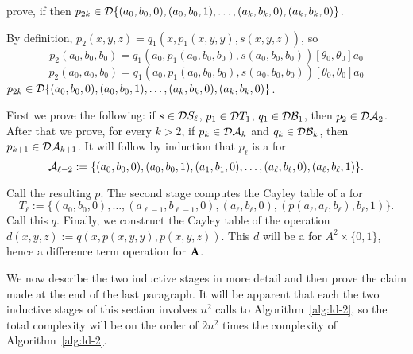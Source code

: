   prove, if
  then
  $p_{2k} \in \mathcal{D} \{(a_0, b_0, 0), (a_0, b_0, 1), \dots, (a_k, b_k, 0), (a_k, b_k, 0)\}$.

  By definition,
  $p_2(x,y,z) = q_1(x, p_1(x,y,y), s(x,y,z))$, so
  \[
  p_2(a_0, b_0, b_0) = q_1(a_0, p_1(a_0,b_0,b_0), s(a_0,b_0,b_0))\mathrel{[\theta_0, \theta_0]}a_0
  \]
  \[
  p_2(a_0, a_0, b_0) = q_1(a_0, p_1(a_0,b_0,b_0), s(a_0,b_0,b_0))\mathrel{[\theta_0, \theta_0]}a_0
  \]
  $p_{2k} \in \mathcal{D} \{(a_0, b_0, 0), (a_0, b_0, 1), \dots, (a_k, b_k, 0), (a_k, b_k, 0)\}$.

  First we prove the following: if $s \in \mathcal{D} S_\ell$,  $p_1 \in \mathcal{D} T_1$, $q_1\in \mathcal{D} \mathcal{B}_1$,
  then $p_2 \in \mathcal{D} \mathcal{A}_2$.
  After that we prove, for every $k>2$, if
  $p_{k} \in \mathcal{D} \mathcal{A}_{k}$ and $q_{k} \in \mathcal{D} \mathcal{B}_k$, then
  $p_{k+1} \in \mathcal{D} \mathcal{A}_{k+1}$.  It will follow by induction that
  $p_{\ell}$ is a \ldto for
  \[
    \mathcal{A}_{\ell-2} :=  \{(a_0, b_0, 0), (a_0, b_0, 1), (a_1,b_1,0), \dots,
    (a_{\ell}, b_{\ell}, 0), (a_\ell, b_\ell, 1)\}.
  \]




























  Call the resulting \ldto $p$.  The second stage computes the Cayley table of a \ldto for
  \[T_\ell := \{(a_0, b_0, 0), \dots,
  (a_{\ell-1}, b_{\ell-1},0), (a_{\ell}, b_{\ell},0), (p(a_{\ell}, a_{\ell}, b_{\ell}), b_\ell, 1)\}.
  \]
  Call this \ldto $q$. Finally, we construct the Cayley table of the operation
  $d(x,y,z) := q(x, p(x,y,y), p(x,y,z))$.
  This $d$ will be a \ldto for $A^2 \times \{0,1\}$, hence a difference term operation for $\mathbf{A}$.

  We now describe the two inductive stages in more detail and then prove the claim made at the end of the
  last paragraph. It will be apparent that
  each the two inductive stages of this section involves
  $n^2$ calls to Algorithm~\ref{alg:ld-2}, so the total complexity will be on the order of
  $2n^2$ times the complexity of Algorithm~\ref{alg:ld-2}.

